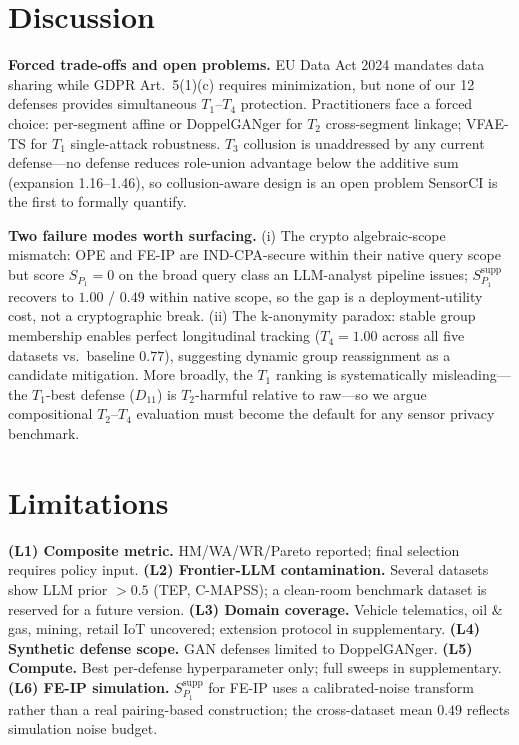 \documentclass{article}
\theoremstyle{remark}
\begin{document}
\section{Discussion}
\label{sec:discussion}

\textbf{Forced trade-offs and open problems.} EU Data Act 2024 mandates data sharing while GDPR Art.~5(1)(c) requires minimization, but none of our 12 defenses provides simultaneous $T_1$--$T_4$ protection. Practitioners face a forced choice: per-segment affine or DoppelGANger for $T_2$ cross-segment linkage; VFAE-TS for $T_1$ single-attack robustness. $T_3$ collusion is unaddressed by any current defense---no defense reduces role-union advantage below the additive sum (expansion 1.16--1.46), so collusion-aware design is an open problem SensorCI is the first to formally quantify.

\textbf{Two failure modes worth surfacing.} (i) The crypto algebraic-scope mismatch: OPE and FE-IP are IND-CPA-secure within their native query scope but score $S_{P_1} = 0$ on the broad query class an LLM-analyst pipeline issues; $S_{P_1}^{\text{supp}}$ recovers to $1.00$ / $0.49$ within native scope, so the gap is a deployment-utility cost, not a cryptographic break. (ii) The k-anonymity paradox: stable group membership enables perfect longitudinal tracking ($T_4 = 1.00$ across all five datasets vs.\ baseline $0.77$), suggesting dynamic group reassignment as a candidate mitigation. More broadly, the $T_1$ ranking is systematically misleading---the $T_1$-best defense ($D_{11}$) is $T_2$-harmful relative to raw---so we argue compositional $T_2$--$T_4$ evaluation must become the default for any sensor privacy benchmark.

\section{Limitations}
\label{sec:limitations}

\textbf{(L1) Composite metric.} HM/WA/WR/Pareto reported; final selection requires policy input.
\textbf{(L2) Frontier-LLM contamination.} Several datasets show LLM prior $> 0.5$ (TEP, C-MAPSS); a clean-room benchmark dataset is reserved for a future version.
\textbf{(L3) Domain coverage.} Vehicle telematics, oil \& gas, mining, retail IoT uncovered; extension protocol in supplementary.
\textbf{(L4) Synthetic defense scope.} GAN defenses limited to DoppelGANger.
\textbf{(L5) Compute.} Best per-defense hyperparameter only; full sweeps in supplementary.
\textbf{(L6) FE-IP simulation.} $S_{P_1}^{\text{supp}}$ for FE-IP uses a calibrated-noise transform rather than a real pairing-based construction; the cross-dataset mean $0.49$ reflects simulation noise budget.
\end{document}
